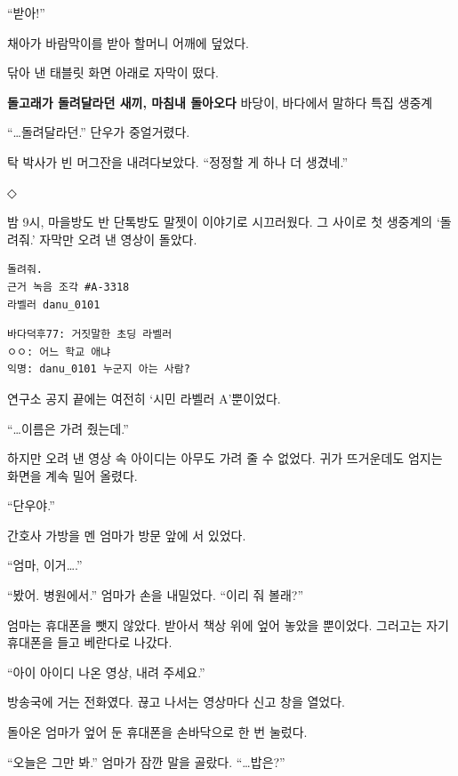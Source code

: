 \documentclass[
  korean,
  letterpaper,
  twoside,
  open=any,
  fontsize=12.5pt,
  headings=small]{scrbook}
\newcommand{\logfont}{\linespread{1}\fontsize{10.8}{15.2}\selectfont}
\begin{document}
``받아!''

채아가 바람막이를 받아 할머니
어깨에 덮었다.

닦아 낸 태블릿 화면 아래로
자막이 떴다.

\textbf{돌고래가 돌려달라던
새끼, 마침내 돌아오다} 바당이,
바다에서 말하다 \textbar{}
특집 생중계

``\ldots 돌려달라던.'' 단우가
중얼거렸다.

탁 박사가 빈 머그잔을
내려다보았다. ``정정할 게 하나
더 생겼네.''

\begin{center}◇\end{center}\nopagebreak

밤 9시, 마을방도 반 단톡방도
말젯이 이야기로 시끄러웠다. 그
사이로 첫 생중계의 `돌려줘.'
자막만 오려 낸 영상이 돌았다.

\begin{Verbatim}[samepage=true,frame=single,framesep=2.5mm,rulecolor=\color{gray},formatcom=\logfont]
돌려줘.
근거 녹음 조각 #A-3318
라벨러 danu_0101
\end{Verbatim}

\begin{Verbatim}[samepage=true,frame=single,framesep=2.5mm,rulecolor=\color{gray},formatcom=\logfont]
바다덕후77: 거짓말한 초딩 라벨러
ㅇㅇ: 어느 학교 애냐
익명: danu_0101 누군지 아는 사람?
\end{Verbatim}

연구소 공지 끝에는 여전히
`시민 라벨러 A'뿐이었다.

``\ldots 이름은 가려 줬는데.''

하지만 오려 낸 영상 속
아이디는 아무도 가려 줄 수
없었다. 귀가 뜨거운데도 엄지는
화면을 계속 밀어 올렸다.

``단우야.''

간호사 가방을 멘 엄마가 방문
앞에 서 있었다.

``엄마, 이거\ldots.''

``봤어. 병원에서.'' 엄마가
손을 내밀었다. ``이리 줘
볼래?''

엄마는 휴대폰을 뺏지 않았다.
받아서 책상 위에 엎어 놓았을
뿐이었다. 그러고는 자기
휴대폰을 들고 베란다로 나갔다.

``아이 아이디 나온 영상, 내려
주세요.''

방송국에 거는 전화였다. 끊고
나서는 영상마다 신고 창을
열었다.

돌아온 엄마가 엎어 둔 휴대폰을
손바닥으로 한 번 눌렀다.

``오늘은 그만 봐.'' 엄마가
잠깐 말을 골랐다.
``\ldots 밥은?''
\end{document}
